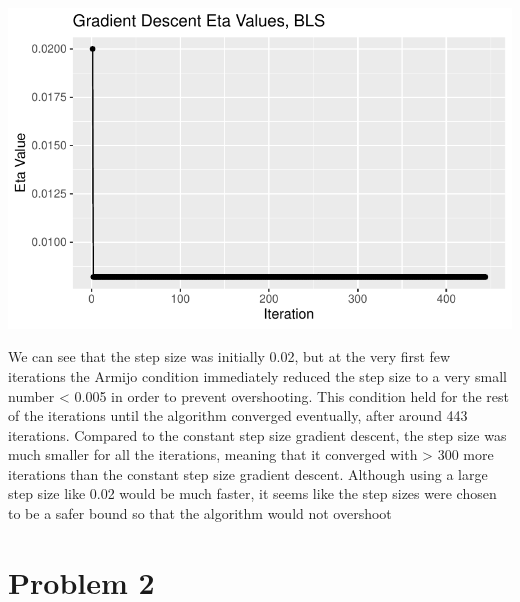 \documentclass[
  letterpaper,
  DIV=11,
  numbers=noendperiod]{scrartcl}
\newenvironment{Shaded}{\begin{snugshade}}{\end{snugshade}}
\newcommand{\AttributeTok}[1]{\textcolor[rgb]{0.40,0.45,0.13}{#1}}
\newcommand{\DecValTok}[1]{\textcolor[rgb]{0.68,0.00,0.00}{#1}}
\newcommand{\FunctionTok}[1]{\textcolor[rgb]{0.28,0.35,0.67}{#1}}
\newcommand{\NormalTok}[1]{\textcolor[rgb]{0.00,0.23,0.31}{#1}}
\newcommand{\OtherTok}[1]{\textcolor[rgb]{0.00,0.23,0.31}{#1}}
\newcommand{\SpecialCharTok}[1]{\textcolor[rgb]{0.37,0.37,0.37}{#1}}
\newcommand{\StringTok}[1]{\textcolor[rgb]{0.13,0.47,0.30}{#1}}
\begin{document}
\begin{Shaded}
\end{Shaded}

\includegraphics{506021334_Stats102B_hw_1_files/figure-pdf/unnamed-chunk-2-1.pdf}

We can see that the step size was initially 0.02, but at the very first
few iterations the Armijo condition immediately reduced the step size to
a very small number \textless{} 0.005 in order to prevent overshooting.
This condition held for the rest of the iterations until the algorithm
converged eventually, after around 443 iterations. Compared to the
constant step size gradient descent, the step size was much smaller for
all the iterations, meaning that it converged with \textgreater{} 300
more iterations than the constant step size gradient descent. Although
using a large step size like 0.02 would be much faster, it seems like
the step sizes were chosen to be a safer bound so that the algorithm
would not overshoot

\section{Problem 2}\label{problem-2}
\end{document}
